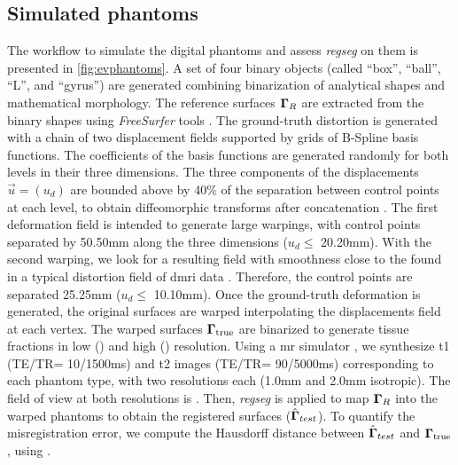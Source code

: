\subsection{Simulated phantoms}\label{sec:digital_phantoms}
The workflow to simulate the digital phantoms and assess
  \emph{regseg} on them is presented in \autoref{fig:evphantoms}.
A set of four binary objects (called ``box'', ``ball'', ``L'',
  and ``gyrus'') are generated combining binarization of
  analytical shapes and mathematical morphology.
The reference surfaces $\boldsymbol{\Gamma}_R$ are extracted from the binary shapes
  using \emph{FreeSurfer} tools \citep{fischl_freesurfer_2012}.
The ground-truth distortion is generated with a chain of two displacement 
  fields supported by grids of B-Spline basis functions.
The coefficients of the basis functions are generated randomly for
  both levels in their three dimensions.
The three components of the displacements $\vec{u} = (u_d)$ 
  are bounded above by 40\% of the separation between control points
  at each level, to obtain diffeomorphic transforms
  after concatenation \citep{rueckert_diffeomorphic_2006}.
The first deformation field is intended to generate large warpings,
  with control points separated by 50.50mm along the three dimensions
  ($u_d\leq$ 20.20mm).
With the second warping, we look for a resulting field with smoothness
  close to the found in a typical distortion field of \gls*{dmri} data
  \citep{irfanoglu_susceptibility_2011}.
Therefore, the control points are separated 25.25mm ($u_d\leq$ 10.10mm).
Once the ground-truth deformation is generated, the original surfaces
  are warped interpolating the displacements field at each vertex.
The warped surfaces $\boldsymbol{\Gamma}_\text{true}$ are binarized to generate tissue fractions
  in low () and high () resolution.
Using a \gls*{mr} simulator \citep{caruyer_phantomas_2014}, we synthesize
  \gls*{t1} (TE/TR= 10/1500ms) and \gls*{t2} images (TE/TR= 90/5000ms)
  corresponding to each phantom type, with two resolutions each
  (1.0mm and 2.0mm isotropic).
The field of view at both resolutions is .
Then, \emph{regseg} is applied to map $\boldsymbol{\Gamma}_R$ into the warped phantoms to
  obtain the registered surfaces ($\hat{\boldsymbol{\Gamma}}_{test}$).
To quantify the misregistration error, we compute the Hausdorff distance between
 $\hat{\boldsymbol{\Gamma}}_{test}$ and $\boldsymbol{\Gamma}_\text{true}$, using \citep{commandeur_vtk_2011}.

